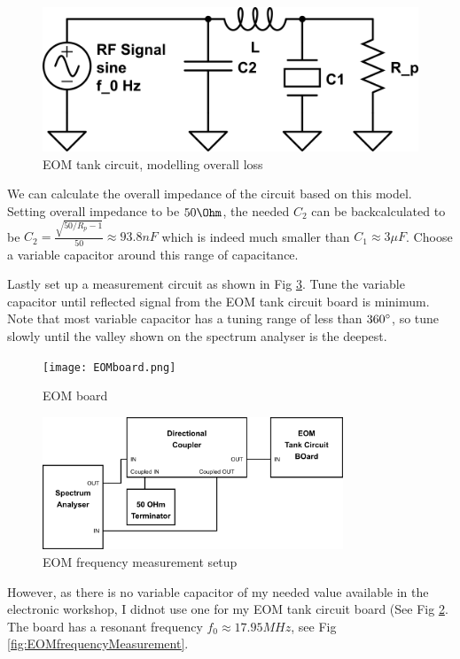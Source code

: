 \documentclass[12pt]{report}
\begin{document}
\begin{figure}[H]
    \centering
    \includegraphics[width=.8\textwidth]{eom-tank-cirucuit2.png}
    \caption{EOM tank circuit, modelling overall loss}
    \label{fig:eom-tank-cirucuit2}
\end{figure}

We can calculate the overall impedance of the circuit based on this model. Setting overall impedance to be $50\Ohm$, the needed $C_2$ can be backcalculated to be $C_2 = \frac{\sqrt{50/R_p -1}}{50} \approx 93.8 nF$ which is indeed much smaller than $C_1 \approx 3 \mu F$. Choose a variable capacitor around this range of capacitance. 
\par
Lastly set up a measurement circuit as shown in Fig \ref{fig:eom-freq-measurement-setup.png}. Tune the variable capacitor until reflected signal from the EOM tank circuit board is minimum. Note that most variable capacitor has a tuning range of less than $360\degree$, so tune slowly until the valley shown on the spectrum analyser is the deepest. 

\begin{figure}[H]
    \centering
    \texttt{[image: EOMboard.png]}
    \caption{EOM board}
    \label{fig:EOMboard}
\end{figure}

\begin{figure}[H]
    \centering
    \includegraphics[width=0.8\textwidth]{eom-freq-measurement-setup.png}
    \caption{EOM frequency measurement setup}
    \label{fig:eom-freq-measurement-setup.png}
\end{figure}

However, as there is no variable capacitor of my needed value available in the electronic workshop, I didnot use one for my EOM tank circuit board (See Fig \ref{fig:EOMboard}. The board has a resonant frequency $f_0 \approx 17.95 MHz$, see Fig \ref{fig:EOMfrequencyMeasurement}. 
\end{document}
